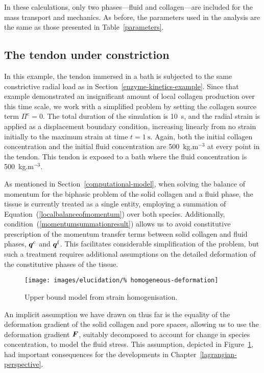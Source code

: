 In these calculations, only two phases---fluid and collagen---are
included for the mass transport and mechanics. As before, the
parameters used in the analysis are the same as those presented in
Table~\ref{parameters}.

\subsection{The tendon under constriction}
\label{constriction-1}

In this example, the tendon immersed in a bath is subjected to the
same constrictive radial load as in
Section~\ref{enzyme-kinetics-example}. Since that example demonstrated
an insignificant amount of local collagen production over this time
scale, we work with a simplified problem by setting the collagen
source term $\Pi^\mathrm{c} = 0$. The total duration of the simulation
is 10~s, and the radial strain is applied as a displacement boundary
condition, increasing linearly from no strain initially to the maximum
strain at time $t = 1~\mathrm{s}$. Again, both the initial collagen
concentration and the initial fluid concentration are 500~kg.m$^{-3}$
at every point in the tendon. This tendon is exposed to a bath where
the fluid concentration is 500~kg.m$^{-3}$.

As mentioned in Section~\ref{computational-model}, when solving the
balance of momentum for the biphasic problem of the solid collagen and
a fluid phase, the tissue is currently treated as a single entity,
employing a summation of Equation~(\ref{localbalanceofmomentum}) over
both species. Additionally, condition~(\ref{momentumsummationresult})
allows us to avoid constitutive prescription of the momentum transfer
terms between solid collagen and fluid phases, $\mbox{\boldmath$ q$}^\mathrm{c}$ and
$\mbox{\boldmath$ q$}^\mathrm{f}$. This facilitates considerable simplification of the
problem, but such a treatment requires additional assumptions on the
detailed deformation of the constitutive phases of the tissue.

\begin{figure}[!hpt]
  \centering
  \texttt{[image: images/elucidation/\%
    homogeneous-deformation]}
  \caption{Upper bound model from strain homogenisation.}
  \label{upper-bound-model}
\end{figure}

An implicit assumption we have drawn on thus far is the equality of
the deformation gradient of the solid collagen and pore spaces,
allowing us to use the deformation gradient $\mbox{\boldmath$ F$}$, suitably decomposed
to account for change in species concentration, to model the fluid
stress. This assumption, depicted in Figure~\ref{upper-bound-model},
had important consequences for the developments in
Chapter~\ref{lagrangian-perspective}.


